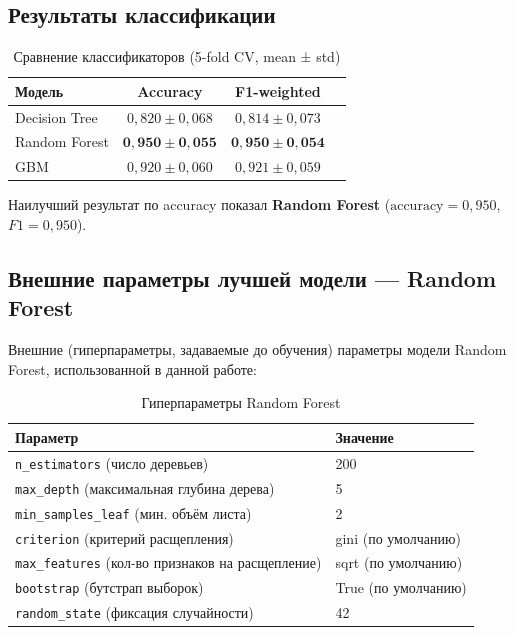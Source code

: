 \documentclass[12pt]{article}
\begin{document}
\subsection{Результаты классификации}

\begin{table}[H]
\centering
\caption{Сравнение классификаторов (5-fold CV, mean ± std)}
\label{tab:models}
\begin{tabular}{lccc}
\toprule
Модель & Accuracy & F1-weighted \\
\midrule
Decision Tree  & $0{,}820 \pm 0{,}068$ & $0{,}814 \pm 0{,}073$ \\
Random Forest  & $\mathbf{0{,}950 \pm 0{,}055}$ & $\mathbf{0{,}950 \pm 0{,}054}$ \\
GBM            & $0{,}920 \pm 0{,}060$ & $0{,}921 \pm 0{,}059$ \\
\bottomrule
\end{tabular}
\end{table}

Наилучший результат по accuracy показал \textbf{Random Forest}
($\text{accuracy} = 0{,}950$, $F1 = 0{,}950$).

\subsection{Внешние параметры лучшей модели — Random Forest}

Внешние (гиперпараметры, задаваемые до обучения) параметры модели Random
Forest, использованной в данной работе:

\begin{table}[H]
\centering
\caption{Гиперпараметры Random Forest}
\label{tab:rf_params}
\begin{tabular}{ll}
\toprule
Параметр & Значение \\
\midrule
\texttt{n\_estimators} (число деревьев) & 200 \\
\texttt{max\_depth} (максимальная глубина дерева) & 5 \\
\texttt{min\_samples\_leaf} (мин. объём листа) & 2 \\
\texttt{criterion} (критерий расщепления) & gini (по умолчанию) \\
\texttt{max\_features} (кол-во признаков на расщепление) & sqrt (по умолчанию) \\
\texttt{bootstrap} (бутстрап выборок) & True (по умолчанию) \\
\texttt{random\_state} (фиксация случайности) & 42 \\
\bottomrule
\end{tabular}
\end{table}
\end{document}
